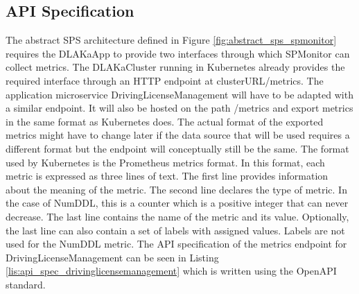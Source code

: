 
\subsection{API Specification}

The abstract SPS architecture defined in Figure \ref{fig:abstract_sps_spmonitor} requires
the DLAKaApp to provide two interfaces through which SPMonitor can collect metrics.
The DLAKaCluster running in Kubernetes already provides the required interface 
through an HTTP endpoint at clusterURL/metrics. The application microservice DrivingLicenseManagement
will have to be adapted with a similar endpoint. It will also be hosted on the path /metrics
and export metrics in the same format as Kubernetes does. The actual format of the exported metrics
might have to change later if the data source that will be used requires a different format
but the endpoint will conceptually still be the same. The format used by Kubernetes is the Prometheus
metrics format. In this format, each metric is expressed as three lines of text. The first line
provides information about the meaning of the metric. The second line declares the type of metric.
In the case of NumDDL, this is a counter which is a positive integer that can never decrease.
The last line contains the name of the metric and its value. Optionally, the last line
can also contain a set of labels with assigned values. Labels are not used for the NumDDL metric.
The API specification of the metrics endpoint for DrivingLicenseManagement can be seen in Listing \ref{lis:api_spec_drivinglicensemanagement}
which is written using the OpenAPI standard.

